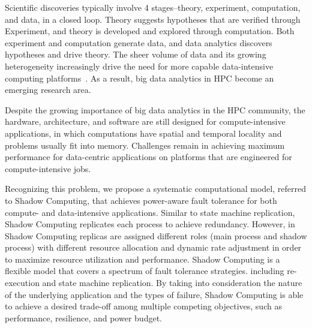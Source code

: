 Scientific discoveries typically involve 4 stages--theory, experiment, computation, and data, in a closed loop. Theory suggests hypotheses that are verified through Experiment, and theory is developed and explored through computation. Both experiment and computation generate data, and data analytics discovers hypotheses and drive theory.
The sheer volume of data and its growing heterogeneity increasingly drive the need for more capable data-intensive computing platforms~\cite{6842585}. As a result, 
big data analytics in HPC become an emerging research area.  

Despite the growing importance of big data analytics in the HPC community, the hardware, architecture, and software are still designed for compute-intensive applications, in which computations have spatial and temporal locality and problems usually fit into memory. Challenges remain in achieving maximum performance for data-centric applications on platforms that are engineered for compute-intensive jobs. 

Recognizing this problem, we propose a systematic computational model, referred to Shadow Computing, that achieves power-aware fault tolerance for both compute- and data-intensive applications. Similar to state machine replication, Shadow Computing replicates each process to achieve redundancy. However, in Shadow Computing replicas are assigned different roles (main process and shadow process) with different resource allocation and dynamic rate adjustment in order to maximize resource utilization and performance.  
Shadow Computing is a flexible model that covers a spectrum of fault tolerance strategies. including re-execution and state machine replication. By taking into consideration the nature of the underlying application and the types of failure, Shadow Computing is able to achieve a desired trade-off among multiple competing objectives, such as performance, resilience, and power budget.  

